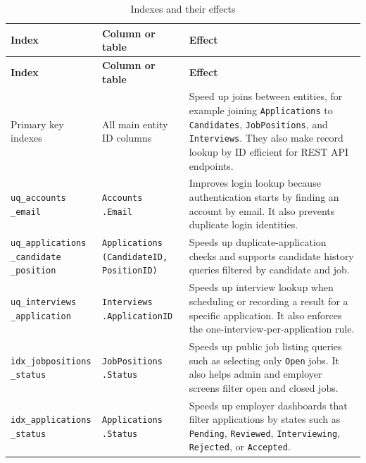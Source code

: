 \documentclass[12pt,a4paper]{report}
\makeatletter
\newcommand{\codebreak}[1]{\begin{tabular}[t]{@{}l@{}}#1\end{tabular}}
\makeatother
\begin{document}
\begin{longtable}{L{0.25\textwidth}L{0.26\textwidth}L{0.39\textwidth}}
\caption{Indexes and their effects}
\label{tab:indexes}\\
\toprule
\textbf{Index} & \textbf{Column or table} & \textbf{Effect} \\
\midrule
\endfirsthead
\toprule
\textbf{Index} & \textbf{Column or table} & \textbf{Effect} \\
\midrule
\endhead
Primary key indexes & All main entity ID columns & Speed up joins between entities, for example joining \texttt{Applications} to \texttt{Candidates}, \texttt{JobPositions}, and \texttt{Interviews}. They also make record lookup by ID efficient for REST API endpoints. \\
\codebreak{\texttt{uq\_accounts}\\\texttt{\_email}} & \codebreak{\texttt{Accounts}\\\texttt{.Email}} & Improves login lookup because authentication starts by finding an account by email. It also prevents duplicate login identities. \\
\codebreak{\texttt{uq\_applications}\\\texttt{\_candidate}\\\texttt{\_position}} & \codebreak{\texttt{Applications}\\\texttt{(CandidateID,}\\\texttt{PositionID)}} & Speeds up duplicate-application checks and supports candidate history queries filtered by candidate and job. \\
\codebreak{\texttt{uq\_interviews}\\\texttt{\_application}} & \codebreak{\texttt{Interviews}\\\texttt{.ApplicationID}} & Speeds up interview lookup when scheduling or recording a result for a specific application. It also enforces the one-interview-per-application rule. \\
\codebreak{\texttt{idx\_jobpositions}\\\texttt{\_status}} & \codebreak{\texttt{JobPositions}\\\texttt{.Status}} & Speeds up public job listing queries such as selecting only \texttt{Open} jobs. It also helps admin and employer screens filter open and closed jobs. \\
\codebreak{\texttt{idx\_applications}\\\texttt{\_status}} & \codebreak{\texttt{Applications}\\\texttt{.Status}} & Speeds up employer dashboards that filter applications by states such as \texttt{Pending}, \texttt{Reviewed}, \texttt{Interviewing}, \texttt{Rejected}, or \texttt{Accepted}. \\

\end{longtable}
\end{document}
